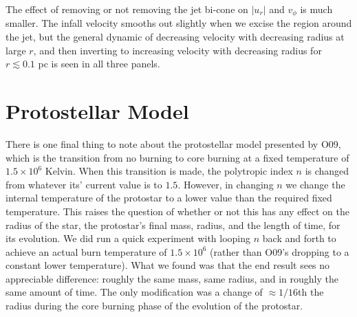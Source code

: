 \documentclass[../dissertation.tex]{subfiles}
\begin{document}
The effect of removing or not removing the jet bi-cone on $|u_r|$ and $v_\phi$ is much smaller.
The infall velocity smooths out slightly when we excise the region around the jet, but the general dynamic of decreasing velocity with decreasing radius at large $r$, and then inverting to increasing velocity with decreasing radius for $r\lesssim 0.1$ pc is seen in all three panels.

%

\section{Protostellar Model}
\label{appendix:jet_protostar}
There is one final thing to note about the protostellar model presented by O09, which is the transition from no burning to core burning at a fixed temperature of $1.5 \times 10^6$ Kelvin.
When this transition is made, the polytropic index $n$ is changed from whatever its' current value is to $1.5$.
However, in changing $n$ we change the internal temperature of the protostar to a lower value than the required fixed temperature.
This raises the question of whether or not this has any effect on the radius of the star, the protostar's final mass, radius, and the length of time, for its evolution.
We did run a quick experiment with looping $n$ back and forth to achieve an actual burn temperature of $1.5 \times 10^6$ (rather than O09's dropping to a constant lower temperature).
What we found was that the end result sees no appreciable difference: roughly the same mass, same radius, and in roughly the same amount of time. The only modification was a change of $\approx 1/16 $th the radius during the core burning phase of the evolution of the protostar.

\end{document}
